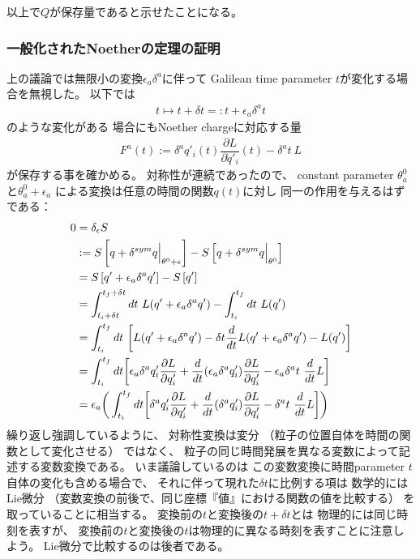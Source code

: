以上で$Q$が保存量であると示せたことになる。

\subsubsection{一般化されたNoetherの定理の証明}

上の議論では無限小の変換$\epsilon_a \delta^a$に伴って
Galilean time parameter $t$が変化する場合を無視した。
以下では
\begin{align}
  t
  \mapsto t + \delta t
  =: t + \epsilon_a \delta^a t
\end{align}
のような変化がある
場合にもNoether chargeに対応する量
\begin{align}
  F^a(t):=
    \delta^a q'_i (t)
  \dfrac{\partial L}{\partial \dot{q}'_i} (t)
-
  \delta^a t
  \ 
  L
\end{align}
が保存する事を確かめる。
対称性が連続であったので、
constant parameter $\theta_a^0$と$\theta_a^0 + \epsilon_a$
による変換は任意の時間の関数$q(t)$に対し
同一の作用を与えるはずである：
\begin{align}
  0 &=
  \delta_{\epsilon} S
\notag\\&:=
  S\left[ q + \delta^{\mathrm{sym}} q\Big|_{\theta^0 + \epsilon} \right]
  -
  S\left[ q + \delta^{\mathrm{sym}} q\Big|_{\theta^0} \right]
\notag\\&=
  S\left[ q' + \epsilon_a \delta^a q' \right]
  -
  S\left[ q' \right]
\notag\\&=
  \int_{t_i + \delta t}^{t_f + \delta t} dt\ 
    L( q' + \epsilon_a \delta^a q' )
  -
  \int_{t_i}^{t_f} dt\ 
    L( q' )
\notag\\&=
  \int_{t_i}^{t_f} dt\ 
  \bigg[
    L( q' + \epsilon_a \delta^a q' )
    - \delta t
    \dfrac{d}{dt}
    L( q' + \epsilon_a \delta^a q' )
  -
    L( q' )
  \bigg]
\notag\\&=
  \int_{t_i}^{t_f} dt
  \bigg[
    \epsilon_a
    \delta^a q'_i
    \dfrac{\partial L}{\partial q'_i}
  +
  \dfrac{d}{dt}
    (\epsilon_a
    \delta^a q'_i)
    \dfrac{\partial L}{\partial \dot{q}'_i}
  -
    \epsilon_a
    \delta^a t
    \ 
    \dfrac{d}{dt}
    L
  \bigg]
\notag\\&=
    \epsilon_a
  \bigg(
  \int_{t_i}^{t_f} dt
  \bigg[
    \delta^a q'_i
    \dfrac{\partial L}{\partial q'_i}
  +
    \dfrac{d}{dt}
    (\delta^a q'_i)
    \dfrac{\partial L}{\partial \dot{q}'_i}
  -
    \delta^a t
    \ 
    \dfrac{d}{dt}
    L
  \bigg]
  \bigg)
\label{action difference under symmetry transformation}
\end{align}
繰り返し強調しているように、
対称性変換は変分
（粒子の位置自体を時間の関数として変化させる）
ではなく、
粒子の同じ時間発展を異なる変数によって記述する変数変換である。
いま議論しているのは
この変数変換に時間parameter $t$自体の変化も含める場合で、
それに伴って現れた$\delta t$に比例する項は
数学的にはLie微分
（変数変換の前後で、同じ座標『値』における関数の値を比較する）
を取っていることに相当する。
変換前の$t$と変換後の$t + \delta t$とは
物理的には同じ時刻を表すが、
変換前の$t$と変換後の$t$は物理的に異なる時刻を表すことに注意しよう。
Lie微分で比較するのは後者である。

